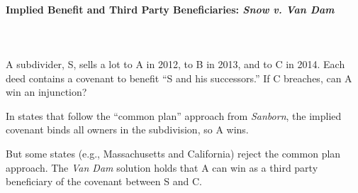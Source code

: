 \paragraph{Implied Benefit and Third Party Beneficiaries: \emph{Snow v. Van 
Dam}}
~\\\\
A subdivider, S, sells a lot to A in 2012, to B in 2013, and to C in 2014. Each 
deed contains a covenant to benefit ``S and his successors.'' If C breaches, 
can A win an injunction?

In states that follow the ``common plan'' approach from \emph{Sanborn}, the 
implied covenant binds all owners in the subdivision, so A wins.

But some states (e.g., Massachusetts and California) reject the common plan 
approach. The \emph{Van Dam} solution holds that A can win as a third party 
beneficiary of the covenant between S and C.

